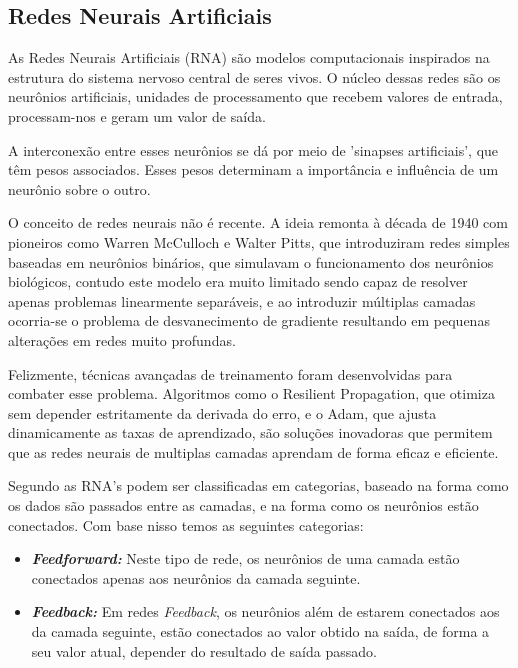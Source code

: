 \documentclass[conference]{IEEEtran}
\begin{document}
\subsection{Redes Neurais Artificiais}
As Redes Neurais Artificiais (RNA) são modelos computacionais inspirados na estrutura do sistema 
nervoso central de seres vivos. O núcleo dessas redes são os neurônios artificiais, unidades de 
processamento que recebem valores de entrada, processam-nos e geram um valor de saída.

A interconexão entre esses neurônios se dá por meio de 'sinapses artificiais', que têm pesos 
associados. Esses pesos determinam a importância e influência de um neurônio sobre o outro.

O conceito de redes neurais não é recente. A ideia remonta à década de 1940 com pioneiros como 
Warren McCulloch e Walter Pitts, que introduziram redes simples baseadas em neurônios binários, 
que simulavam o funcionamento dos neurônios biológicos, contudo este modelo era muito limitado sendo 
capaz de resolver apenas problemas linearmente separáveis, e ao introduzir múltiplas camadas 
ocorria-se o problema de desvanecimento de gradiente resultando em pequenas alterações em redes 
muito profundas.\cite{braga2016redes}

Felizmente, técnicas avançadas de treinamento foram desenvolvidas para combater esse problema. 
Algoritmos como o Resilient Propagation, que otimiza sem depender estritamente da derivada do erro, 
e o Adam, que ajusta dinamicamente as taxas de aprendizado, são soluções inovadoras que permitem que 
as redes neurais de multiplas camadas aprendam de forma eficaz e eficiente.\cite{braga2016redes}

Segundo \cite{faceli2022inteligencia} as RNA's podem ser classificadas em categorias, baseado na 
forma como os dados são passados entre as camadas, e na forma como os neurônios estão conectados. 
Com base nisso temos as seguintes categorias:
\begin{itemize}
    \item {\emph{\textbf{Feedforward:}}}
    Neste tipo de rede, os neurônios de uma camada estão conectados apenas aos neurônios da camada seguinte.
    \item {\emph{\textbf{Feedback:}}}
    Em redes \emph{Feedback}, os neurônios além de estarem conectados aos da camada seguinte, estão 
    conectados ao valor obtido na saída, de forma a seu valor atual, depender do resultado de saída passado.
\end{itemize}
\end{document}
